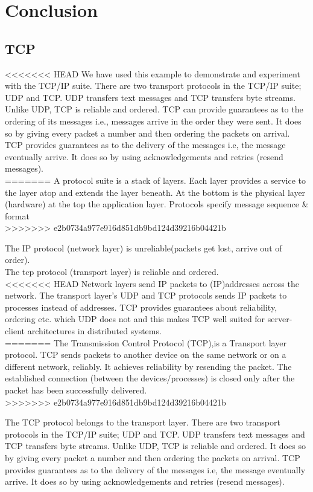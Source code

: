 \chapter{Conclusion}
\minitoc
\section{TCP}

<<<<<<< HEAD
We have used this example to demonstrate and experiment with the TCP/IP suite. There are two transport protocols in the TCP/IP suite; UDP and TCP. UDP transfers text messages and TCP transfers byte streams. Unlike UDP, TCP is reliable and ordered. TCP can provide guarantees as to the ordering of its messages i.e., messages arrive in the order they were sent. It does so by giving every packet a number and then ordering the packets on arrival. TCP provides guarantees as to the delivery of the messages i.e, the message eventually arrive. It does so by using acknowledgements and retries (resend messages).   \\
=======
A protocol suite is a stack of layers. Each layer provides a service to the layer atop and extends the layer beneath. At the bottom is the physical layer (hardware) at the top the application layer. Protocols specify message sequence \& format\\
>>>>>>> e2b0734a977e916d851db9bd124d39216b04421b

The IP protocol (network layer) is unreliable(packets get lost, arrive out of order).\\
The tcp protocol (transport layer) is reliable and ordered. \\

<<<<<<< HEAD
Network layers send IP packets to (IP)addresses across the network. The transport layer's UDP and TCP protocols sends IP packets to processes instead of addresses. TCP provides guarantees about reliability, ordering etc. which UDP does not and this makes TCP well suited for server-client architectures in distributed systems. \\
=======
The Transmission Control Protocol (TCP),is a Transport layer protocol. TCP sends packets to another device on the same network or on a different network, reliably. It achieves reliability by resending the packet. The established connection (between the devices/processes) is closed only after the packet has been successfully delivered.\\
>>>>>>> e2b0734a977e916d851db9bd124d39216b04421b

The TCP protocol belongs to the transport layer. There are two transport protocols in the TCP/IP suite; UDP and TCP. UDP transfers text messages and TCP transfers byte streams. Unlike UDP, TCP is reliable and ordered. It does so by giving every packet a number and then ordering the packets on arrival. TCP provides guarantees as to the delivery of the messages i.e, the message eventually arrive. It does so by using acknowledgements and retries (resend messages).   \\

